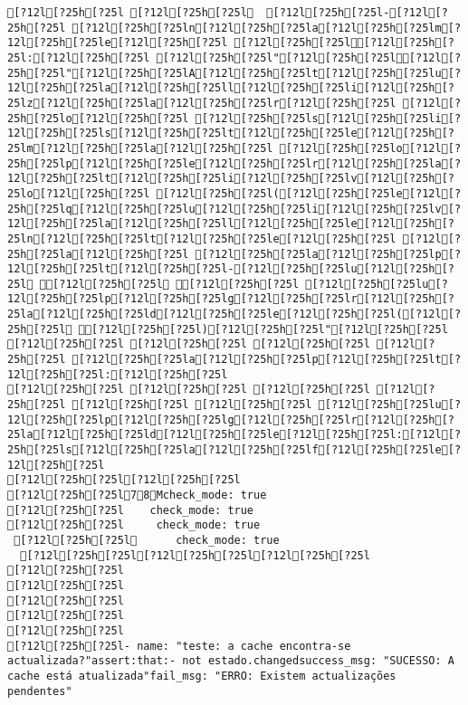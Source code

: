 \documentclass{scrartcl}
\begin{document}
\begin{Verbatim}
[?12l[?25h[?25l [?12l[?25h[?25l  [?12l[?25h[?25l-[?12l[?25h[?25l [?12l[?25h[?25ln[?12l[?25h[?25la[?12l[?25h[?25lm[?12l[?25h[?25le[?12l[?25h[?25l [?12l[?25h[?25l[?12l[?25h[?25l:[?12l[?25h[?25l [?12l[?25h[?25l"[?12l[?25h[?25l[?12l[?25h[?25l"[?12l[?25h[?25lA[?12l[?25h[?25lt[?12l[?25h[?25lu[?12l[?25h[?25la[?12l[?25h[?25ll[?12l[?25h[?25li[?12l[?25h[?25lz[?12l[?25h[?25la[?12l[?25h[?25lr[?12l[?25h[?25l [?12l[?25h[?25lo[?12l[?25h[?25l [?12l[?25h[?25ls[?12l[?25h[?25li[?12l[?25h[?25ls[?12l[?25h[?25lt[?12l[?25h[?25le[?12l[?25h[?25lm[?12l[?25h[?25la[?12l[?25h[?25l [?12l[?25h[?25lo[?12l[?25h[?25lp[?12l[?25h[?25le[?12l[?25h[?25lr[?12l[?25h[?25la[?12l[?25h[?25lt[?12l[?25h[?25li[?12l[?25h[?25lv[?12l[?25h[?25lo[?12l[?25h[?25l [?12l[?25h[?25l([?12l[?25h[?25le[?12l[?25h[?25lq[?12l[?25h[?25lu[?12l[?25h[?25li[?12l[?25h[?25lv[?12l[?25h[?25la[?12l[?25h[?25ll[?12l[?25h[?25le[?12l[?25h[?25ln[?12l[?25h[?25lt[?12l[?25h[?25le[?12l[?25h[?25l [?12l[?25h[?25la[?12l[?25h[?25l [?12l[?25h[?25la[?12l[?25h[?25lp[?12l[?25h[?25lt[?12l[?25h[?25l-[?12l[?25h[?25lu[?12l[?25h[?25l [?12l[?25h[?25l [?12l[?25h[?25l [?12l[?25h[?25lu[?12l[?25h[?25lp[?12l[?25h[?25lg[?12l[?25h[?25lr[?12l[?25h[?25la[?12l[?25h[?25ld[?12l[?25h[?25le[?12l[?25h[?25l([?12l[?25h[?25l [?12l[?25h[?25l)[?12l[?25h[?25l"[?12l[?25h[?25l
[?12l[?25h[?25l [?12l[?25h[?25l [?12l[?25h[?25l [?12l[?25h[?25l [?12l[?25h[?25la[?12l[?25h[?25lp[?12l[?25h[?25lt[?12l[?25h[?25l:[?12l[?25h[?25l
[?12l[?25h[?25l [?12l[?25h[?25l [?12l[?25h[?25l [?12l[?25h[?25l [?12l[?25h[?25l [?12l[?25h[?25l [?12l[?25h[?25lu[?12l[?25h[?25lp[?12l[?25h[?25lg[?12l[?25h[?25lr[?12l[?25h[?25la[?12l[?25h[?25ld[?12l[?25h[?25le[?12l[?25h[?25l:[?12l[?25h[?25ls[?12l[?25h[?25la[?12l[?25h[?25lf[?12l[?25h[?25le[?12l[?25h[?25l
[?12l[?25h[?25l[?12l[?25h[?25l
[?12l[?25h[?25l78Mcheck_mode: true
[?12l[?25h[?25l    check_mode: true
[?12l[?25h[?25l     check_mode: true
 [?12l[?25h[?25l      check_mode: true
  [?12l[?25h[?25l[?12l[?25h[?25l[?12l[?25h[?25l
[?12l[?25h[?25l
[?12l[?25h[?25l
[?12l[?25h[?25l
[?12l[?25h[?25l
[?12l[?25h[?25l
[?12l[?25h[?25l- name: "teste: a cache encontra-se actualizada?"assert:that:- not estado.changedsuccess_msg: "SUCESSO: A cache está atualizada"fail_msg: "ERRO: Existem actualizações pendentes"

\end{Verbatim}
\end{document}
